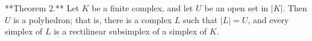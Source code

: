 **Theorem 2.** Let $K$ be a finite complex, and let $U$ be an open set in $|K|$. Then $U$ is a polyhedron; that is, there is a complex $L$ such that $|L| = U$, and every simplex of $L$ is a rectilinear subsimplex of a simplex of $K$.
